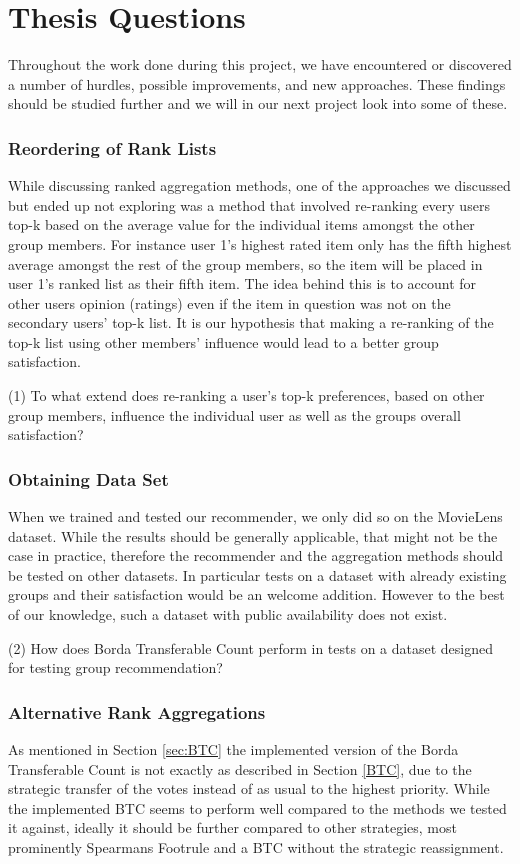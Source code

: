 \section{Thesis Questions}
Throughout the work done during this project, we have encountered or discovered a number of hurdles, possible improvements, and new approaches. These findings should be studied further and we will in our next project look into some of these.
\subsubsection{Reordering of Rank Lists}
While discussing ranked aggregation methods, one of the approaches we discussed but ended up not exploring was a method that involved re-ranking every users top-k based on the average value for the individual items amongst the other group members. For instance user 1's highest rated item only has the fifth highest average amongst the rest of the group members, so the item will be placed in user 1's ranked list as their fifth item. The idea behind this is to account for other users opinion (ratings) even if the item in question was not on the secondary users' top-k list. It is our hypothesis that making a re-ranking of the top-k list using other members' influence would lead to a better group satisfaction.

(1) To what extend does re-ranking a user's top-k preferences, based on other group members, influence the individual user as well as the groups overall satisfaction?

\subsubsection{Obtaining Data Set}
When we trained and tested our recommender, we only did so on the MovieLens dataset. While the results should be generally applicable, that might not be the case in practice, therefore the recommender and the aggregation methods should be tested on other datasets. In particular tests on a dataset with already existing groups and their satisfaction would be an welcome addition. However to the best of our knowledge, such a dataset with public availability does not exist. 

(2) How does Borda Transferable Count perform in tests on a dataset designed for testing group recommendation?

\subsubsection{Alternative Rank Aggregations}
As mentioned in Section \ref{sec:BTC} the implemented version of the Borda Transferable Count is not exactly as described in Section \ref{BTC}, due to the strategic transfer of the votes instead of as usual to the highest priority. While the implemented BTC seems to perform well compared to the methods we tested it against, ideally it should be further compared to other strategies, most prominently Spearmans Footrule and a BTC without the strategic reassignment.

